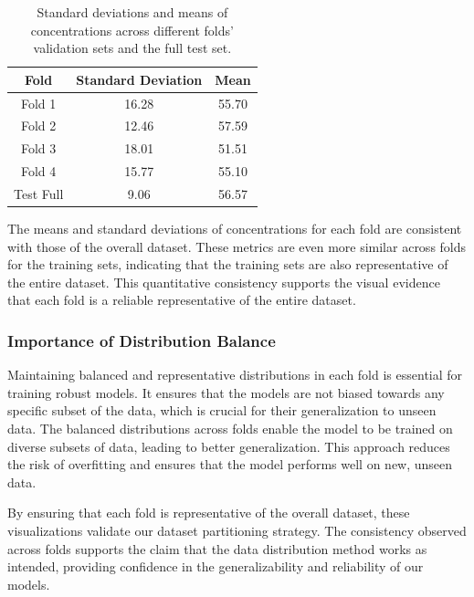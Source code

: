 \begin{table}[h!]
    \centering
    \begin{tabular}{|c|c|c|}
        \hline
        \textbf{Fold} & \textbf{Standard Deviation} & \textbf{Mean} \\
        \hline
        Fold 1 & 16.28 & 55.70 \\
        \hline
        Fold 2 & 12.46 & 57.59 \\
        \hline
        Fold 3 & 18.01 & 51.51 \\
        \hline
        Fold 4 & 15.77 & 55.10 \\
        \hline
        Test Full & 9.06 & 56.57 \\
        \hline
    \end{tabular}
    \caption{Standard deviations and means of  concentrations across different folds' validation sets and the full test set.}
    \label{tab:siO2_std_means}
\end{table}

The means and standard deviations of  concentrations for each fold are consistent with those of the overall dataset.
These metrics are even more similar across folds for the training sets, indicating that the training sets are also representative of the entire dataset.
This quantitative consistency supports the visual evidence that each fold is a reliable representative of the entire dataset.

\subsubsection{Importance of Distribution Balance}

Maintaining balanced and representative distributions in each fold is essential for training robust models.
It ensures that the models are not biased towards any specific subset of the data, which is crucial for their generalization to unseen data.
The balanced distributions across folds enable the model to be trained on diverse subsets of data, leading to better generalization.
This approach reduces the risk of overfitting and ensures that the model performs well on new, unseen data.

By ensuring that each fold is representative of the overall dataset, these visualizations validate our dataset partitioning strategy.
The consistency observed across folds supports the claim that the data distribution method works as intended, providing confidence in the generalizability and reliability of our models.



